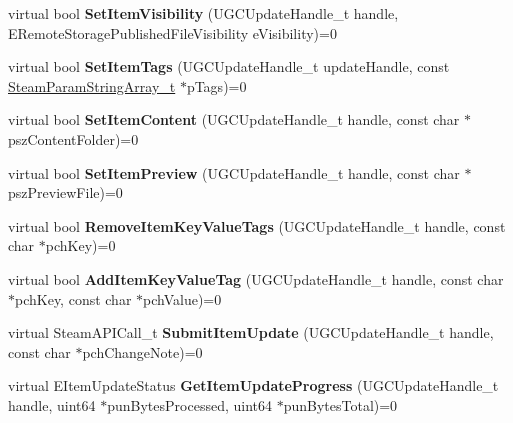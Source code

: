 \begin{DoxyCompactItemize}
\item 
\hypertarget{classISteamUGC_ad65383e36e6edf374e55273b2740d69b}{}virtual bool {\bfseries Set\+Item\+Visibility} (U\+G\+C\+Update\+Handle\+\_\+t handle, E\+Remote\+Storage\+Published\+File\+Visibility e\+Visibility)=0\label{classISteamUGC_ad65383e36e6edf374e55273b2740d69b}

\item 
\hypertarget{classISteamUGC_af98a34b764aba2d012d9274edfda6af2}{}virtual bool {\bfseries Set\+Item\+Tags} (U\+G\+C\+Update\+Handle\+\_\+t update\+Handle, const \hyperlink{structSteamParamStringArray__t}{Steam\+Param\+String\+Array\+\_\+t} $\ast$p\+Tags)=0\label{classISteamUGC_af98a34b764aba2d012d9274edfda6af2}

\item 
\hypertarget{classISteamUGC_a50d65b55db7f4760117c23758c235bed}{}virtual bool {\bfseries Set\+Item\+Content} (U\+G\+C\+Update\+Handle\+\_\+t handle, const char $\ast$psz\+Content\+Folder)=0\label{classISteamUGC_a50d65b55db7f4760117c23758c235bed}

\item 
\hypertarget{classISteamUGC_a316f5f47e820ae4ec8fd2746e42f9f53}{}virtual bool {\bfseries Set\+Item\+Preview} (U\+G\+C\+Update\+Handle\+\_\+t handle, const char $\ast$psz\+Preview\+File)=0\label{classISteamUGC_a316f5f47e820ae4ec8fd2746e42f9f53}

\item 
\hypertarget{classISteamUGC_a59f019cc186039c09fc1a3505d9444bf}{}virtual bool {\bfseries Remove\+Item\+Key\+Value\+Tags} (U\+G\+C\+Update\+Handle\+\_\+t handle, const char $\ast$pch\+Key)=0\label{classISteamUGC_a59f019cc186039c09fc1a3505d9444bf}

\item 
\hypertarget{classISteamUGC_aec583220da9bc8e2465daaa5e5ec372b}{}virtual bool {\bfseries Add\+Item\+Key\+Value\+Tag} (U\+G\+C\+Update\+Handle\+\_\+t handle, const char $\ast$pch\+Key, const char $\ast$pch\+Value)=0\label{classISteamUGC_aec583220da9bc8e2465daaa5e5ec372b}

\item 
\hypertarget{classISteamUGC_af7949cf8d026feae9345c54a90aeaaa8}{}virtual Steam\+A\+P\+I\+Call\+\_\+t {\bfseries Submit\+Item\+Update} (U\+G\+C\+Update\+Handle\+\_\+t handle, const char $\ast$pch\+Change\+Note)=0\label{classISteamUGC_af7949cf8d026feae9345c54a90aeaaa8}

\item 
\hypertarget{classISteamUGC_ac422eb210329fc081c0f8d440f26ac96}{}virtual E\+Item\+Update\+Status {\bfseries Get\+Item\+Update\+Progress} (U\+G\+C\+Update\+Handle\+\_\+t handle, uint64 $\ast$pun\+Bytes\+Processed, uint64 $\ast$pun\+Bytes\+Total)=0\label{classISteamUGC_ac422eb210329fc081c0f8d440f26ac96}


\end{DoxyCompactItemize}
